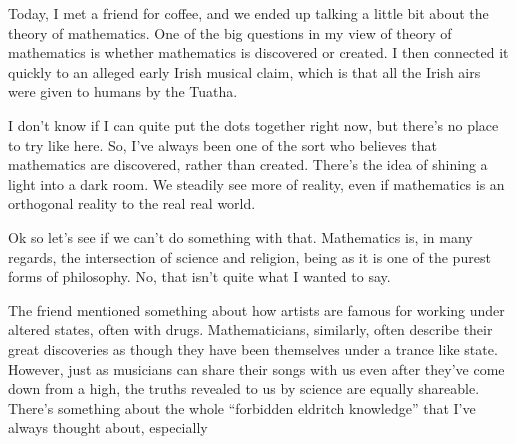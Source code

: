 \documentclass[12pt]{article}[titlepage]
\newcommand{\say}[1]{``#1''}
\renewcommand{\,}{\textsuperscript{,}}
\begin{document}
Today, I met a friend for coffee, and we ended up talking a little bit about the theory of mathematics.
One of the big questions in my view of theory of mathematics is whether mathematics is discovered or created.
I then connected it quickly to an alleged early Irish musical claim, which is that all the Irish airs were given to humans by the Tuatha.

I don't know if I can quite put the dots together right now, but there's no place to try like here.
So, I've always been one of the sort who believes that mathematics are discovered, rather than created.
There's the idea of shining a light into a dark room.
We steadily see more of reality, even if mathematics is an orthogonal reality to the real real world.\endnotemark[2]

Ok so let's see if we can't do something with that.
Mathematics is\endnotemark[3], in many regards, the intersection of science and religion, being as it is one of the purest forms of philosophy.
No, that isn't quite what I wanted to say.

The friend mentioned something about how artists are famous for working under altered states, often with drugs.
Mathematicians, similarly, often describe their great discoveries as though they have been themselves under a trance like state.
However, just as musicians can share their songs with us even after they've come down from a high, the truths revealed to us by science are equally shareable.
There's something about the whole \say{forbidden eldritch knowledge} that I've always thought about, especially 
\endnotes
\end{document}
